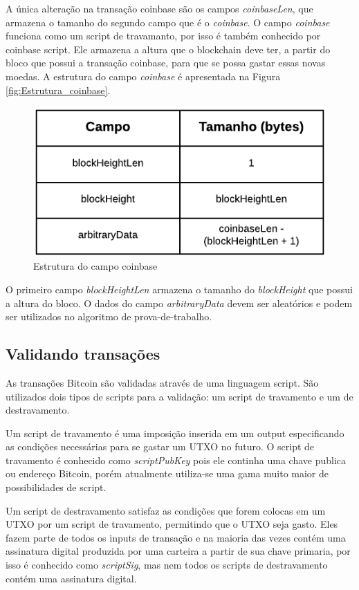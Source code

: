 \documentclass[conference,compsoc]{IEEEtran}
\begin{document}
A única alteração na transação coinbase são os campos \textit{coinbaseLen}, que armazena o tamanho do segundo campo que é o \textit{coinbase}. O campo \textit{coinbase} funciona como um script de travamanto, por isso é também conhecido por coinbase script. Ele armazena a altura que o blockchain deve ter, a partir do bloco que possui a transação coinbase, para que se possa gastar essas novas moedas. A estrutura do campo \textit{coinbase} é apresentada na Figura \ref{fig:Estrutura_coinbase}. 
 
\begin{figure}[H]
    \centering
    \includegraphics[keepaspectratio=true, scale=0.6]{img/Estrutura_campo_coinbase.pdf}
    \caption{Estrutura do campo coinbase \cite{DevBitKO}}
    \label{fig:Estrutura_campo_coinbase}
\end{figure}

O primeiro campo \textit{blockHeightLen} armazena o tamanho do \textit{blockHeight} que possui a altura do bloco. O dados do campo \textit{arbitraryData} devem ser aleatórios e podem ser utilizados no algoritmo de prova-de-trabalho.


\subsection{Validando transações}
\label{section:Validando transações}
As transações Bitcoin são validadas através de uma linguagem script. São utilizados dois tipos de scripts para a validação: um script de travamento e um de destravamento.

Um script de travamento é uma imposição inserida em um output especificando as condições necessárias para se gastar um UTXO no futuro. O script de travamento é conhecido como \textit{scriptPubKey} pois ele continha uma chave publica ou endereço Bitcoin, porém atualmente utiliza-se uma gama muito maior de possibilidades de script.

Um script de destravamento satisfaz as condições que forem colocas em um UTXO por um script de travamento, permitindo que o UTXO seja gasto. Eles fazem parte de todos os inputs de transação e na maioria das vezes contém uma assinatura digital produzida por uma carteira a partir de sua chave primaria, por isso é conhecido como \textit{scriptSig}, mas nem todos os scripts de destravamento contém uma assinatura digital.
\end{document}
